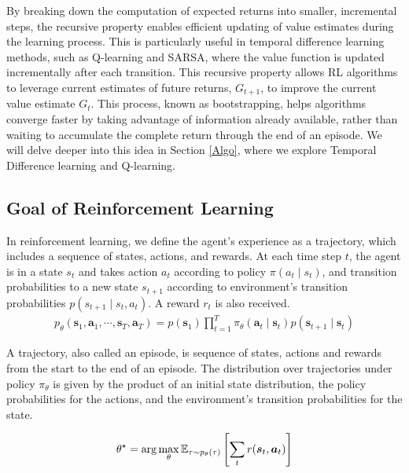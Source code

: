 By breaking down the computation of expected returns into smaller, incremental steps, the recursive property enables efficient updating of value estimates during the learning process. This is particularly useful in temporal difference learning methods, such as Q-learning and SARSA, where the value function is updated incrementally after each transition. This recursive property allows RL algorithms to leverage current estimates of future returns, $G_{t+1}$, to improve the current value estimate $G_t$. This process, known as bootstrapping, helps algorithms converge faster by taking advantage of information already available, rather than waiting to accumulate the complete return through the end of an episode. We will delve deeper into this idea in Section \ref{Algo}, where we explore Temporal Difference learning and Q-learning.

\subsection{Goal of Reinforcement Learning}

In reinforcement learning, we define the agent's experience as a trajectory, which includes a sequence of states, actions, and rewards. At each time step $t$, the agent is in a state $s_t$ and takes action $a_t$ according to policy $\pi(a_t \mid s_t)$, and transition probabilities to a new state $s_{t+1}$ according to environment's transition probabilities $p(s_{t+1} \mid s_{t}, a_{t})$. A reward $r_t$ is also received.
\begin{align*}
    p_{\theta}(\boldsymbol{s}_1, \boldsymbol{a}_1, \cdots ,\boldsymbol{s}_T, \boldsymbol{a}_T) = p(\boldsymbol{s}_1) \prod_{t=1}^{T} \pi_{\theta}(\boldsymbol{a}_{t} \mid \boldsymbol{s}_t) p(\boldsymbol{s}_{t+1} \mid \boldsymbol{s}_t)
\end{align*}


A trajectory, also called an episode, is sequence of states, actions and rewards from the start to the end of an episode. The distribution over trajectories under policy $\pi_\theta$ is given by the product of an initial state distribution, the policy probabilities for the actions, and the environment's transition probabilities for the state. 

\begin{align*}\label{RL-Objective}
    \theta^{\star} = \arg \max_{\theta} \mathbb E_{\tau \sim p_{\theta}(\tau)} \left[ 
    \sum_{t} r(\boldsymbol{s}_t, \boldsymbol{a}_t)
    \right]
\end{align*}

